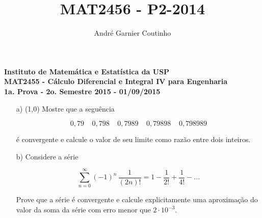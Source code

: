 \documentclass[12pt,a4paper]{article}
\title{MAT2456 - P2-2014}
\author{André Garnier Coutinho}
\begin{document}
\begin{center}
\textbf{Instituto de Matemática e Estatística da USP\\
MAT2455 - Cálculo Diferencial e Integral IV para Engenharia\\}
\textbf{1a. Prova - 2o. Semestre 2015 - 01/09/2015}
\end{center}


\begin{itemize}
	\item[a)] (1,0) Mostre que a seguência
	
	$$0,79 \;\;\;\; 0,798 \;\;\;\; 0,7989 \;\;\;\; 0,79898 \;\;\;\; 0,798989$$
	
	é convergente e calcule o valor de seu limite como razão entre dois inteiros.
	
	\item[b)] Considere a série
	
	$$\displaystyle\sum_{n=0}^\infty (-1)^n \, \frac{1}{(2n)!} = 1 - \frac{1}{2!} + \frac{1}{4!} - ...$$
	
    Prove que a série é convergente e calcule explicitamente uma aproximação do valor da soma da série com erro menor que $2 \cdot 10^{-3}$.
\end{itemize}
\end{document}
